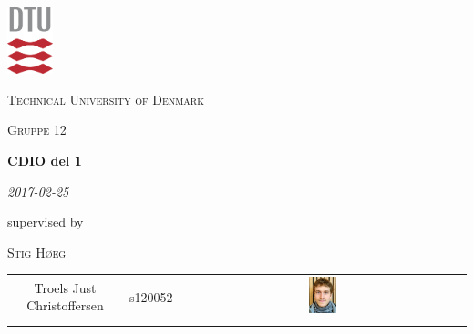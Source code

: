 \begin{titlepage}

\centering
\includegraphics[width=0.1\textwidth]{images/dtu.pdf}\par\vspace{1cm}

{\scshape\LARGE Technical University of Denmark \par}
	\vspace{1cm}
	{\scshape\Large Gruppe 12\par}
	\vspace{1.5cm}
	{\huge\bfseries CDIO del 1\par}
	\vspace{2cm}
	{\Large\itshape 2017-02-25\par}
	\vfill
	supervised by\par
	\textsc{Stig Høeg}

	\vfill

\end{titlepage}

\begin{tabular}{c c c}
    Troels Just Christoffersen & s120052 & \includegraphics[width=0.1\textwidth]{images/Troels.jpg}\\
     & 
\end{tabular}
